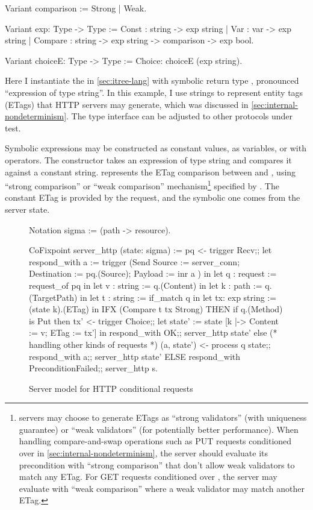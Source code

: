 \begin{coq}
  Variant comparison := Strong | Weak.

  Variant exp: Type -> Type :=
    Const    : string -> exp string
  | Var      : var    -> exp string
  | Compare  : string -> exp string -> comparison -> exp bool.

  Variant choiceE: Type -> Type :=
    Choice: choiceE (exp string).
\end{coq}

Here I instantiate the  in \autoref{sec:itree-lang} with symbolic
return type , pronounced ``expression of type string''.  In
this example, I use strings to represent entity tags (ETags) that HTTP servers
may generate, which was discussed in \autoref{sec:internal-nondeterminism}.  The
type interface can be adjusted to other protocols under test.

Symbolic expressions may be constructed as constant values, as variables, or
with operators.  The  constructor takes an expression of type
string and compares it against a constant string.  
represents the ETag comparison between  and , using ``strong
comparison'' or ``weak comparison'' mechanism\footnote{\http servers may choose
to generate ETags as ``strong validators'' (with uniqueness guarantee) or ``weak
validators'' (for potentially better performance).  When handling
compare-and-swap operations such as PUT requests conditioned over
 in \autoref{sec:internal-nondeterminism}, the server should
evaluate its precondition with ``strong comparison'' that don't allow weak
validators to match any ETag.  For GET requests conditioned over
, the server may evaluate with ``weak comparison'' where
a weak validator may match another ETag.} specified by .  The constant
ETag is provided by the request, and the symbolic one comes from the server
state.

\begin{figure}
\begin{coq}
  Notation sigma := (path -> resource).

  CoFixpoint server_http (state: sigma) :=
    pq <- trigger Recv;;
    let respond_with a :=
      trigger (Send { Source      := server_conn;
                      Destination := pq.(Source);
                      Payload     := inr a } ) in
    let q : request    := request_of pq        in
    let v : string     := q.(Content)          in
    let k : path       := q.(TargetPath)       in
    let t : string     := if_match q           in
    let tx: exp string := (state k).(ETag)     in
    IFX (Compare t tx Strong)
    THEN
      if q.(Method) is Put
      then
        tx' <- trigger Choice;;
        let state' := state [k |-> {Content := v; ETag := tx'}] in
        respond_with OK;;
        server_http state'
      else                 (* handling other kinds of requests *)
        (a, state') <- process q state;;
        respond_with a;;
        server_http state'
    ELSE
      respond_with PreconditionFailed;;
      server_http s.
\end{coq}
\caption{Server model for HTTP conditional requests}
\label{fig:if-match-server}
\end{figure}

